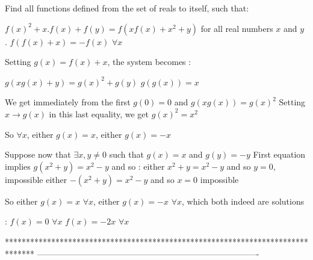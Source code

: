 


\begin{solution}
	\begin{tcolorbox}Find all functions defined from the set of reals to itself, such that: 

$f(x)^2+x.f(x)+f(y)=f(xf(x)+x^2+y) $ for all real numbers $x$ and $y$ .
$f(f(x)+x)=-f(x)$ $\forall x$\end{tcolorbox}
Setting $g(x)=f(x)+x$, the system becomes :

$g(xg(x)+y)=g(x)^2+g(y)$
$g(g(x))=x$

We get immediately from the first $g(0)=0$ and $g(xg(x))=g(x)^2$
Setting $x\to g(x)$ in this last equality, we get $g(x)^2=x^2$

So $\forall x$, either $g(x)=x$, either $g(x)=-x$

Suppose now that $\exists x,y\ne 0$ such that $g(x)=x$ and $g(y)=-y$
First equation implies $g(x^2+y)=x^2-y$ and so :
either $x^2+y=x^2-y$ and so $y=0$, impossible
either $-(x^2+y)=x^2-y$ and so $x=0$ impossible

So either $g(x)=x$ $\forall x$, either $g(x)=-x$ $\forall x$, which both indeed are solutions

 :
$f(x)=0$ $\forall x$
$f(x)=-2x$ $\forall x$
\end{solution}
*******************************************************************************
-------------------------------------------------------------------------------

